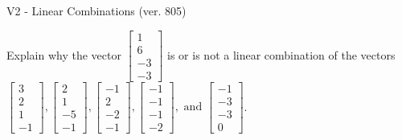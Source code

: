 \begin{exercise}
  \begin{exerciseTitle}V2 - Linear Combinations (ver. 805)\end{exerciseTitle}
  \begin{exerciseStatement}
    Explain why the vector \(\left[\begin{array}{c}
1 \\
6 \\
-3 \\
-3
\end{array}\right]\)  is or is not a linear 
	combination of the vectors \(\left[\begin{array}{c}
3 \\
2 \\
1 \\
-1
\end{array}\right] , \left[\begin{array}{c}
2 \\
1 \\
-5 \\
-1
\end{array}\right] , \left[\begin{array}{c}
-1 \\
2 \\
-2 \\
-1
\end{array}\right] , \left[\begin{array}{c}
-1 \\
-1 \\
-1 \\
-2
\end{array}\right] , \text{ and } \left[\begin{array}{c}
-1 \\
-3 \\
-3 \\
0
\end{array}\right]\).
	



\end{exerciseStatement}
\end{exercise}
